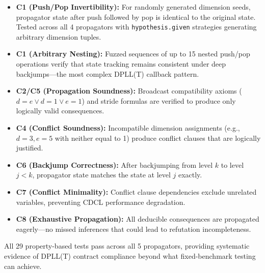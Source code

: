\documentclass[11pt]{article}
\begin{document}
\begin{itemize}[leftmargin=2em]
  \item \textbf{C1 (Push/Pop Invertibility):}
    For randomly generated dimension seeds, propagator state after
    push followed by pop is identical to the original state.
    Tested across all 4 propagators with \texttt{hypothesis.given}
    strategies generating arbitrary dimension tuples.
  \item \textbf{C1 (Arbitrary Nesting):}
    Fuzzed sequences of up to 15 nested push/pop operations
    verify that state tracking remains consistent under deep
    backjumps---the most complex DPLL(T) callback pattern.
  \item \textbf{C2/C5 (Propagation Soundness):}
    Broadcast compatibility axioms ($d = e \lor d = 1 \lor e = 1$)
    and stride formulas are verified to produce only logically
    valid consequences.
  \item \textbf{C4 (Conflict Soundness):}
    Incompatible dimension assignments (e.g., $d = 3, e = 5$
    with neither equal to 1) produce conflict clauses that are
    logically justified.
  \item \textbf{C6 (Backjump Correctness):}
    After backjumping from level $k$ to level $j < k$,
    propagator state matches the state at level $j$ exactly.
  \item \textbf{C7 (Conflict Minimality):}
    Conflict clause dependencies exclude unrelated variables,
    preventing CDCL performance degradation.
  \item \textbf{C8 (Exhaustive Propagation):}
    All deducible consequences are propagated eagerly---no
    missed inferences that could lead to refutation incompleteness.
\end{itemize}

All 29 property-based tests pass across all 5 propagators, providing
systematic evidence of DPLL(T) contract compliance beyond what
fixed-benchmark testing can achieve.
\end{document}

